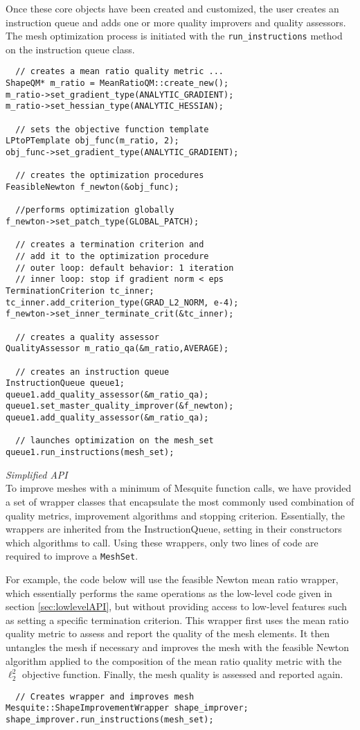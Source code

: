 \documentclass[psfig]{article}
\begin{document}
Once these core objects have been created and customized, the user
creates an instruction queue and adds one or more quality improvers
and quality assessors.  The mesh optimization process is initiated
with the {\tt run\_instructions} method on the instruction queue
class.
\begin{verbatim}
  // creates a mean ratio quality metric ...
ShapeQM* m_ratio = MeanRatioQM::create_new();
m_ratio->set_gradient_type(ANALYTIC_GRADIENT);
m_ratio->set_hessian_type(ANALYTIC_HESSIAN);

  // sets the objective function template
LPtoPTemplate obj_func(m_ratio, 2);
obj_func->set_gradient_type(ANALYTIC_GRADIENT);

  // creates the optimization procedures
FeasibleNewton f_newton(&obj_func);

  //performs optimization globally
f_newton->set_patch_type(GLOBAL_PATCH);

  // creates a termination criterion and 
  // add it to the optimization procedure
  // outer loop: default behavior: 1 iteration
  // inner loop: stop if gradient norm < eps
TerminationCriterion tc_inner;
tc_inner.add_criterion_type(GRAD_L2_NORM, e-4);
f_newton->set_inner_terminate_crit(&tc_inner);

  // creates a quality assessor
QualityAssessor m_ratio_qa(&m_ratio,AVERAGE);

  // creates an instruction queue
InstructionQueue queue1;
queue1.add_quality_assessor(&m_ratio_qa);
queue1.set_master_quality_improver(&f_newton);
queue1.add_quality_assessor(&m_ratio_qa);

  // launches optimization on the mesh_set
queue1.run_instructions(mesh_set);
\end{verbatim} 

{\it Simplified API} \\

To improve meshes with a minimum of Mesquite function calls, we have 
provided a set of wrapper classes that encapsulate the 
most commonly used combination of quality metrics, improvement
algorithms and stopping criterion. Essentially, the wrappers are
inherited from the InstructionQueue, setting in their constructors
which algorithms to call. Using these wrappers, only
two lines of code are required to improve a \texttt{MeshSet}.

For example, the code below will use the feasible Newton mean ratio
wrapper, which essentially performs the same operations as the
low-level code given in section \ref{sec:lowlevelAPI}, but without
providing access to low-level features such as setting a specific
termination criterion.  This wrapper first uses the mean ratio quality
metric to assess and report the quality of the mesh elements. It then
untangles the mesh if necessary and improves the mesh with the
feasible Newton algorithm applied to the composition of the mean ratio
quality metric with the $\ell_2^2$ objective function. Finally, the
mesh quality is assessed and reported again.
\begin{verbatim}
  // Creates wrapper and improves mesh
Mesquite::ShapeImprovementWrapper shape_improver;
shape_improver.run_instructions(mesh_set);
\end{verbatim}
\end{document}
